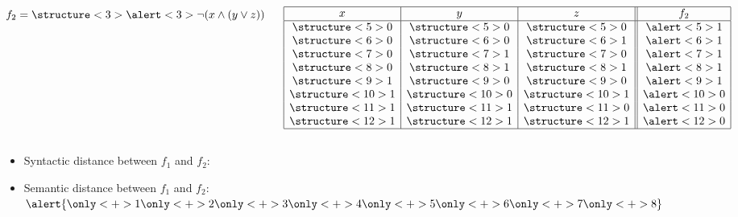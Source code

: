 \documentclass{beamer}
\newcommand{\AND}{\land}
\newcommand{\OR}{\lor}
\newcommand{\NOT}{\lnot}
\begin{document}
{\begin{columns}[c]
    $f_2 = \structure<3>{\alert<3>{\NOT}(x \AND (y \OR z))}$
    \begin{table}
      {\small
      $
      \begin{array}{|c|c|c||c|}
        \hline
        x & y & z & f_2\\
        \hline
        \structure<5>{0} & \structure<5>{0} & \structure<5>{0} & \alert<5>{1}\\
        \structure<6>{0} & \structure<6>{0} & \structure<6>{1} & \alert<6>{1}\\
        \structure<7>{0} & \structure<7>{1} & \structure<7>{0} & \alert<7>{1}\\
        \structure<8>{0} & \structure<8>{1} & \structure<8>{1} & \alert<8>{1}\\
        \structure<9>{1} & \structure<9>{0} & \structure<9>{0} & \alert<9>{1}\\
        \structure<10>{1} & \structure<10>{0} & \structure<10>{1} & \alert<10>{0}\\
        \structure<11>{1} & \structure<11>{1} & \structure<11>{0} & \alert<11>{0}\\
        \structure<12>{1} & \structure<12>{1} & \structure<12>{1} & \alert<12>{0}\\
        \hline
      \end{array}
      $
      }
    \end{table}
    
  \end{columns}

  \pause

  \begin{itemize}
  \item<+-> Syntactic distance between $f_1$ and $f_2$:
  \item<+-> Semantic distance between $f_1$ and $f_2$:
    $\alert{\only<+>{1}\only<+>{2}\only<+>{3}\only<+>{4}
      \only<+>{5}\only<+>{6}\only<+>{7}\only<+>{8}}$
  \end{itemize}
}
\end{document}
